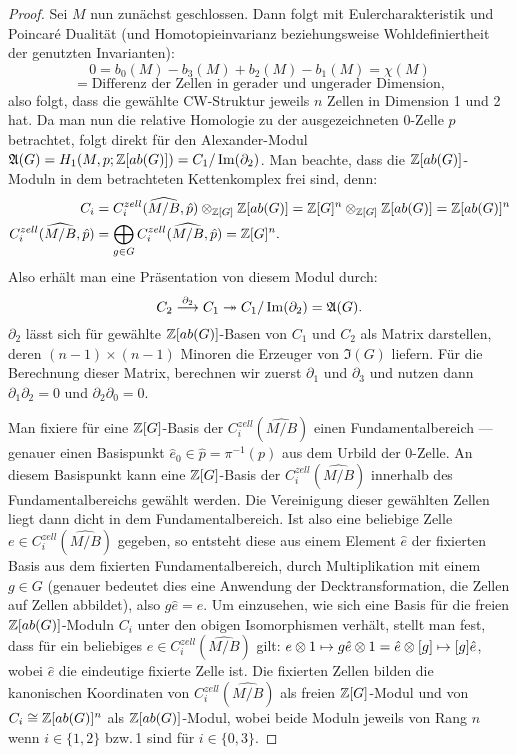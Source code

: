 \begin{proof}
	Sei $M$ nun zunächst geschlossen. Dann folgt mit Eulercharakteristik und Poincaré Dualität (und Homotopieinvarianz beziehungsweise Wohldefiniertheit der genutzten Invarianten):
	\[
		0=b_0(M)-b_3(M)+b_2(M)-b_1(M) = \chi(M) 
	\]
	\[
		= \text{Differenz der Zellen in gerader und ungerader Dimension},
	\]
	also folgt, dass die gewählte CW-Struktur jeweils $n$ Zellen in Dimension 1 und 2 hat. Da man nun die relative Homologie zu der ausgezeichneten $0$-Zelle $p$ betrachtet, folgt direkt für den Alexander-Modul $\mathfrak A(G)= H_1(M,p;\mathbb{Z}[ab(G)])=C_1/\operatorname{Im}(\partial _2)$. Man beachte, dass die $\mathbb{Z}[ab(G)]$-Moduln in dem betrachteten Kettenkomplex frei sind, denn: 
	\begin{align*}
		C_i &=C_i^{zell}(\widehat{M/B},\hat p)\otimes_{\mathbb{Z}[G]}\mathbb{Z}[ab(G)] = \mathbb{Z}[G]^n \otimes_{\mathbb{Z}[G]} \mathbb{Z}[ab(G)] = \mathbb{Z}[ab(G)]^n\\
		C_i^{zell}(\widehat{M/B},\hat p) &= \bigoplus_{g \in G} C_i^{zell}(\widehat{M/B},\hat p) = \mathbb{Z}[G]^n.
	\end{align*}
	Also erhält man eine Präsentation von diesem Modul durch:
	\[
		C_2 \stackrel {\partial_2} \longrightarrow C_1 \twoheadrightarrow C_1/\operatorname{Im}(\partial_2) = \mathfrak A(G).
	\]
	$\partial_2$ lässt sich für gewählte $\mathbb{Z}[ab(G)]$-Basen von $C_1$ und $C_2$ als Matrix darstellen, deren $(n-1)\times (n-1)$ Minoren die Erzeuger von $\mathfrak I(G)$ liefern. Für die Berechnung dieser Matrix, berechnen wir zuerst $\partial_1$ und $\partial_3$ und nutzen dann $\partial_1\partial_2=0$ und $\partial_2\partial_0=0$.

	Man fixiere für eine $\mathbb{Z}[G]$-Basis der $C^{zell}_i(\widehat{M/B})$ einen Fundamentalbereich --- genauer einen Basispunkt $\hat e_0 \in \hat p = \pi^{-1}(p)$ aus dem Urbild der 0-Zelle. An diesem Basispunkt kann eine $\mathbb{Z}[G]$-Basis der $C_i^{zell}(\widehat{ M/B})$ innerhalb des Fundamentalbereichs gewählt werden. Die Vereinigung dieser gewählten Zellen liegt dann dicht in dem Fundamentalbereich. Ist also eine beliebige Zelle $e \in C_i^{zell}(\widehat{ M/B})$ gegeben, so entsteht diese aus einem Element $\hat e$ der fixierten Basis aus dem fixierten Fundamentalbereich, durch Multiplikation mit einem $g\in G$ (genauer bedeutet dies eine Anwendung der Decktransformation, die Zellen auf Zellen abbildet), also $g\hat e = e$. Um einzusehen, wie sich eine Basis für die freien $\mathbb{Z}[ab(G)]$-Moduln $C_i$ unter den obigen Isomorphismen verhält, stellt man fest, dass für ein beliebiges $e\in C_i^{zell}(\widehat{ M/B})$ gilt: $e\otimes 1 \mapsto g\hat e \otimes 1 = \hat e \otimes [g] \mapsto [g]\hat e $, wobei $\hat e$ die eindeutige fixierte Zelle ist. Die fixierten Zellen bilden die kanonischen Koordinaten von $C_i^{zell}(\widehat{M/B})$ als freien $\mathbb{Z}[G]$-Modul und von $C_i \cong \mathbb{Z}[ab(G)]^n$ als $\mathbb{Z}[ab(G)]$-Modul, wobei beide Moduln jeweils von Rang $n$ wenn $i\in \{1,2\}$ bzw.\,1 sind für $i\in \{0,3\}$. 


\end{proof}
